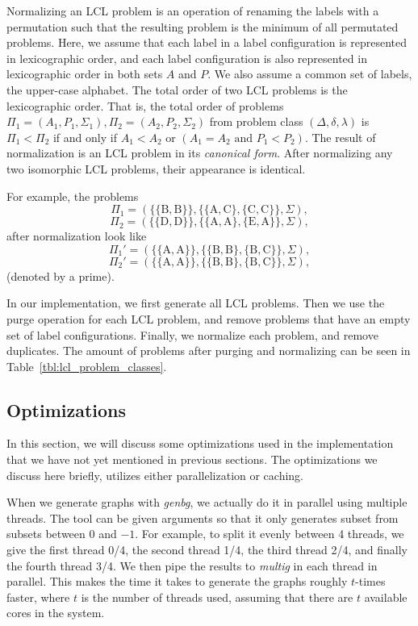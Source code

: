 Normalizing an LCL problem is an operation of renaming the labels with a permutation such that the resulting problem is the minimum of all permutated problems.
Here, we assume that each label in a label configuration is represented in lexicographic order, and each label configuration is also represented in lexicographic order in both sets $A$ and $P$.
We also assume a common set of labels, the upper-case alphabet.
The total order of two LCL problems is the lexicographic order.
That is, the total order of problems $\Pi_1=(A_1, P_1, \Sigma_1), \Pi_2=(A_2, P_2, \Sigma_2)$ from problem class $(\Delta, \delta, \lambda)$ is $\Pi_1 < \Pi_2$ if and only if $A_1 < A_2$ or $(A_1 = A_2 \text{ and } P_1 < P_2)$.
The result of normalization is an LCL problem in its \emph{canonical form}.
After normalizing any two isomorphic LCL problems, their appearance is identical.

For example, the problems
$$\Pi_1=(\{\{\mathrm{B, B}\}\}, \{\{\mathrm{A, C}\}, \{\mathrm{C,C\}}\}, \Sigma),$$
$$\Pi_2=(\{\{\mathrm{D, D}\}\}, \{\{\mathrm{A,A\}},\{\mathrm{E, A}\}\}, \Sigma),$$ after normalization look like
$$\Pi_1'=(\{\{\mathrm{A, A}\}\}, \{\{\mathrm{B, B}\},\{\mathrm{B, C}\}\}, \Sigma),$$
$$\Pi_2'=(\{\{\mathrm{A, A}\}\}, \{\{\mathrm{B, B}\},\{\mathrm{B, C}\}\}, \Sigma),$$ (denoted by a prime).

In our implementation, we first generate all LCL problems.
Then we use the purge operation for each LCL problem, and remove problems that have an empty set of label configurations.
Finally, we normalize each problem, and remove duplicates.
The amount of problems after purging and normalizing can be seen in Table~\ref{tbl:lcl_problem_classes}.



\subsection{Optimizations} \label{sec:implementation:optimizations}
In this section, we will discuss some optimizations used in the implementation that we have not yet mentioned in previous sections.
The optimizations we discuss here briefly, utilizes either parallelization or caching.

When we generate graphs with \emph{genbg}, we actually do it in parallel using multiple threads.
The tool can be given arguments  so that it only generates subset  from subsets between $0$ and $-1$.
For example, to split it evenly between 4 threads, we give the first thread 0/4, the second thread 1/4, the third thread 2/4, and finally the fourth thread 3/4.
We then pipe the results to \emph{multig} in each thread in parallel.
This makes the time it takes to generate the graphs roughly $t$-times faster, where $t$ is the number of threads used, assuming that there are $t$ available cores in the system.

